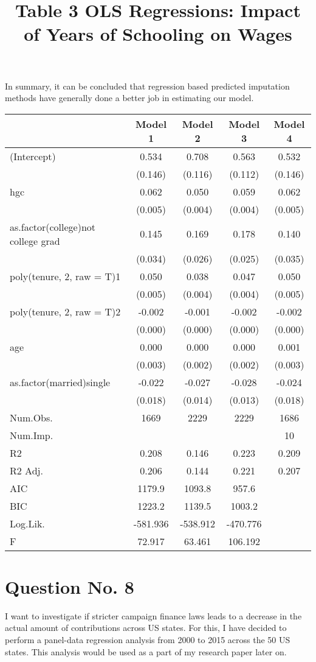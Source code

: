 \documentclass{article}
\begin{document}
In summary, it can be concluded that regression based predicted imputation methods have generally done a better job in estimating our model.

\begin{table}[hbt!]
\centering
\title{Table 3 OLS Regressions: Impact of Years of Schooling on Wages}
\begin{tabular}[t]{lcccc}
\toprule
  & Model 1 & Model 2 & Model 3 & Model 4\\
\midrule
(Intercept) & 0.534 & 0.708 & 0.563 & 0.532\\
 & (0.146) & (0.116) & (0.112) & (0.146)\\
hgc & 0.062 & 0.050 & 0.059 & 0.062\\
 & (0.005) & (0.004) & (0.004) & \vphantom{1} (0.005)\\
as.factor(college)not college grad & 0.145 & 0.169 & 0.178 & 0.140\\
 & (0.034) & (0.026) & (0.025) & (0.035)\\
poly(tenure, 2, raw = T)1 & 0.050 & 0.038 & 0.047 & 0.050\\
 & (0.005) & (0.004) & (0.004) & (0.005)\\
poly(tenure, 2, raw = T)2 & -0.002 & -0.001 & -0.002 & -0.002\\
 & (0.000) & (0.000) & (0.000) & (0.000)\\
age & 0.000 & 0.000 & 0.000 & 0.001\\
 & (0.003) & (0.002) & (0.002) & (0.003)\\
as.factor(married)single & -0.022 & -0.027 & -0.028 & -0.024\\
 & (0.018) & (0.014) & (0.013) & (0.018)\\
\midrule
Num.Obs. & 1669 & 2229 & 2229 & 1686\\
Num.Imp. &  &  &  & 10\\
R2 & 0.208 & 0.146 & 0.223 & 0.209\\
R2 Adj. & 0.206 & 0.144 & 0.221 & 0.207\\
AIC & 1179.9 & 1093.8 & 957.6 & \\
BIC & 1223.2 & 1139.5 & 1003.2 & \\
Log.Lik. & -581.936 & -538.912 & -470.776 & \\
F & 72.917 & 63.461 & 106.192 & \\
\bottomrule
\end{tabular}
\end{table}

\section{Question No. 8}
I want to investigate if stricter campaign finance laws leads to a decrease in the actual amount of contributions across US states. For this, I have decided to perform a panel-data regression analysis from 2000 to 2015 across the 50 US states. This analysis would be used as a part of my research paper later on.
\end{document}

